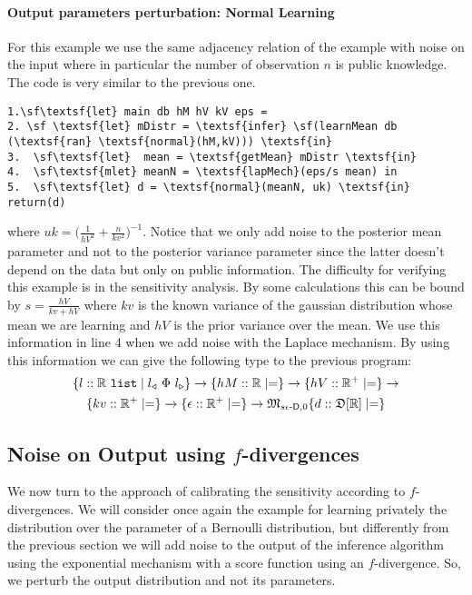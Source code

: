 \documentclass{sig-alternate-05-2015}
\theoremstyle{plain}
\theoremstyle{definition}
\theoremstyle{corollary}
\def\reals{\ensuremath{\mathbb{R}}\xspace}
\def\kwlist{\mathtt{list}}
\newcommand{\stlist}[1]{{#1}\ \kwlist}
\def\lvmark{\triangleleft}
\def\rvmark{\triangleright}
\renewcommand{\l}[1]{#1_\lvmark}
\renewcommand{\r}[1]{#1_\rvmark}
\def\R{\mathbb{R}}
\newcommand{\rplus}{\R^+}
\newcommand{\real}[0]{\ensuremath{\mathbb{R}}\xspace}
\newcommand{\fdiv}{\ensuremath{f}}
\begin{document}
\paragraph{Output parameters perturbation: Normal Learning}
For this example we use the same adjacency relation of the example
with noise on the input where in particular the number of observation
$n$ is public knowledge. The code is very similar to the previous one. 
\begin{Verbatim}[commandchars=\\\{\}]
1.\sf\textsf{let} main db hM hV kV eps =
2. \sf \textsf{let} mDistr = \textsf{infer} \sf(learnMean db (\textsf{ran} \textsf{normal}(hM,kV))) \textsf{in}
3.  \sf\textsf{let}  mean = \textsf{getMean} mDistr \textsf{in}
4.  \sf\textsf{mlet} meanN = \textsf{lapMech}(eps/s mean) in
5.  \sf\textsf{let} d = \textsf{normal}(meanN, uk) \textsf{in} return(d)
\end{Verbatim}
where $uk=\big(\frac{1}{hV^2}+\frac{n}{kv^2}\big)^{-1}$. Notice that we only add noise to the posterior 
mean parameter and not to the posterior variance parameter since the latter doesn't depend on the data but only on public information.
The difficulty for verifying this example is in the sensitivity analysis. By
some calculations this can be bound by
$s=\frac{hV}{ kv + hV}$ where $kv$ is the known variance of the gaussian distribution whose mean we are learning and 
$hV$ is the prior variance over the mean. We use this information in line 4 when we add
noise with the Laplace mechanism. By using
this information we can give the following type to the previous program:
\begin{multline*} 
\{l:: \stlist{\reals} \mid\l{l}\ \Phi\ \r{l} \} \rightarrow\{hM:: \reals \mid  =
\}\rightarrow\{hV:: \rplus  \mid = \}\rightarrow\\\{kv:: \rplus  \mid =
\}\rightarrow\{\epsilon:: \rplus  \mid =
\}\rightarrow\mathfrak{M}_{s\epsilon\textnormal{-}\mathsf{D},0}\{d::
\mathfrak{D}[\real] \mid  = \}
\end{multline*}
\subsection{Noise on Output using \fdiv-divergences}
We now turn to the approach of calibrating the sensitivity according
to \fdiv-divergences.  We will consider once again the example for
learning privately the distribution over the parameter of a Bernoulli
distribution, but differently from the previous section we will add
noise to the output of the inference algorithm using the exponential
mechanism with a score function using an \fdiv-divergence. So, we 
perturb the output distribution and not its parameters.
\end{document}
